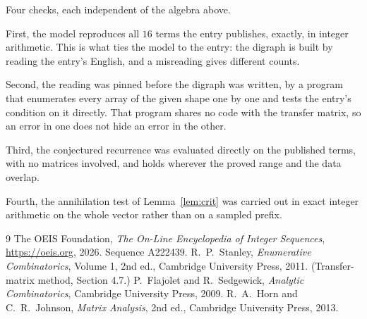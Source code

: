 \documentclass[11pt,a4paper]{article}
\theoremstyle{plain}
\theoremstyle{definition}
\begin{document}
Four checks, each independent of the algebra above.

First, the model reproduces all $16$ terms the entry publishes, exactly, in integer
arithmetic. This is what ties the model to the entry: the digraph is built by reading the
entry's English, and a misreading gives different counts.

Second, the reading was pinned before the digraph was written, by a program that enumerates
every array of the given shape one by one and tests the entry's condition on it directly. That program shares no code with the transfer matrix, so an error in one does not
hide an error in the other.

Third, the conjectured recurrence was evaluated directly on the published terms, with no
matrices involved, and holds wherever the proved range and the data overlap.

Fourth, the annihilation test of Lemma~\ref{lem:crit} was carried out in exact integer
arithmetic on the whole vector rather than on a sampled prefix.

\begin{thebibliography}{9}
 The OEIS Foundation, \emph{The On-Line Encyclopedia of Integer
Sequences}, \url{https://oeis.org}, 2026. Sequence A222439.
 R.~P.~Stanley, \emph{Enumerative Combinatorics}, Volume 1, 2nd ed.,
Cambridge University Press, 2011. (Transfer-matrix method, Section 4.7.)
 P.~Flajolet and R.~Sedgewick, \emph{Analytic Combinatorics}, Cambridge
University Press, 2009.
 R.~A.~Horn and C.~R.~Johnson, \emph{Matrix Analysis}, 2nd ed., Cambridge
University Press, 2013.
\end{thebibliography}
\end{document}
